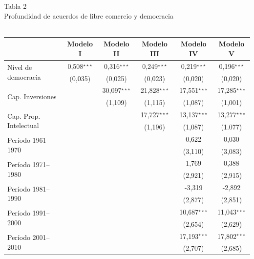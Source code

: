 \documentclass[a4paper]{tufte-handout}
\begin{document}
\begin{table}[h]
  \centering
  \selectfont
   \smallskip\noindent\small Tabla 2 \\ Profundidad de acuerdos de libre comercio y democracia \\~\\
  \begin{tabular}{l c c c c c}
    \toprule
     & Modelo I & Modelo II & Modelo III & Modelo IV & Modelo V \\ \midrule
    \multirow{2}{*}{Nivel de democracia} & 0,508$^{\star\star\star}$ & 0,316$^{\star\star\star}$  & 0,249$^{\star\star\star}$  & 0,219$^{\star\star\star}$  & 0,196$^{\star\star\star}$ \\
    & {\scriptsize (0,035)} & {\scriptsize (0,025)} & {\scriptsize (0,023)} & {\scriptsize (0,020)} & {\scriptsize (0,020)} \\ 
    \multirow{2}{*}{Cap. Inversiones} & & 30,097$^{\star\star\star}$ & 21,828$^{\star\star\star}$ & 17,551$^{\star\star\star}$ & 17,285$^{\star\star\star}$ \\
    & & {\scriptsize (1,109)} & {\scriptsize (1,115)} & {\scriptsize (1,087)} & {\scriptsize (1,001)} \\
    \multirow{2}{*}{Cap. Prop. Intelectual} & & & 17,727$^{\star\star\star}$ & 13,137$^{\star\star\star}$ & 13,277$^{\star\star\star}$ \\
    & & & {\scriptsize (1,196)} & {\scriptsize (1,087)} & {\scriptsize (1.077)} \\
    \multirow{2}{*}{Período 1961--1970} & & & & 0,622  & 0,030 \\
    & & & & {\scriptsize (3,110)} & {\scriptsize (3,083)} \\
    \multirow{2}{*}{Período 1971--1980} & & & & 1,769 & 0,388 \\
    & & & & {\scriptsize (2,921)} & {\scriptsize (2,915)} \\
    \multirow{2}{*}{Período  1981--1990} & & & & -3,319 & -2,892 \\
    & & & & {\scriptsize (2,877)} & {\scriptsize (2,851)} \\
    \multirow{2}{*}{Período 1991--2000} & & & & 10,687$^{\star\star\star}$ & 11,043$^{\star\star\star}$ \\
    & & & & {\scriptsize (2,654)} & {\scriptsize (2,629)} \\ 
    \multirow{2}{*}{Período  2001--2010} & & & & 17,193$^{\star\star\star}$ & 17,802$^{\star\star\star}$ \\
    & & & & {\scriptsize (2,707)} & {\scriptsize (2,685)}\\ 

\end{tabular}
\end{table}
\end{document}
